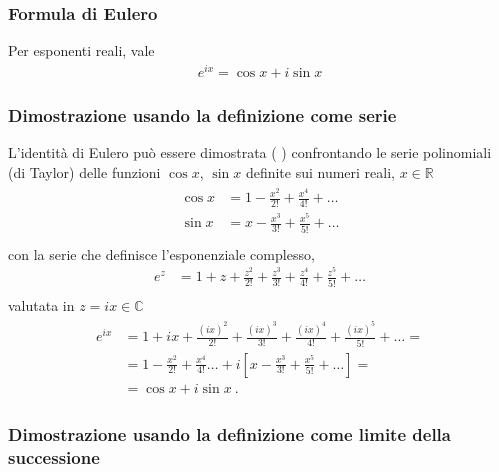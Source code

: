 \documentclass[letterpaper,10pt,italian]{jupyterBook}
\begin{document}
\subsubsection{Formula di Eulero}
\label{\detokenize{ch/algebra/complex-algebra:formula-di-eulero}}
\sphinxAtStartPar
Per esponenti reali, vale
\begin{equation*}
\begin{split}e^{i x} = \cos x + i \sin x\end{split}
\end{equation*}\subsubsection*{Dimostrazione usando la definizione come serie}

\sphinxAtStartPar
L’identità di Eulero può essere dimostrata ( ) confrontando le serie polinomiali (di Taylor) delle funzioni \(\cos x\), \(\sin x\) definite sui numeri reali, \(x \in \mathbb{R}\)
\begin{equation*}
\begin{split}\begin{aligned}
  \cos x & = 1 - \frac{x^2}{2!} + \frac{x^4}{4!} + \dots \\
  \sin x & = x - \frac{x^3}{3!} + \frac{x^5}{5!} + \dots \\
\end{aligned}\end{split}
\end{equation*}
\sphinxAtStartPar
con la serie che definisce l’esponenziale complesso,
\begin{equation*}
\begin{split}
  e^z & = 1 + z + \frac{z^2}{2!} + \frac{z^3}{3!} + \frac{z^4}{4!} + \frac{z^5}{5!} + \dots \\
\end{split}
\end{equation*}
\sphinxAtStartPar
valutata in \(z = i x \in \mathbb{C}\)
\begin{equation*}
\begin{split}\begin{aligned}
  e^{i x} 
      & = 1 + i x + \frac{(i x)^2}{2!} + \frac{(i x)^3}{3!} + \frac{(i x)^4}{4!} + \frac{(i x)^5}{5!} + \dots = \\
      & = 1 - \frac{x^2}{2!} + \frac{x^4}{4!} \dots + i \left[ x - \frac{x^3}{3!} + \frac{x^5}{5!}  + \dots \right] = \\
      & = \cos x + i \sin x \ .
\end{aligned}\end{split}
\end{equation*}\subsubsection*{Dimostrazione usando la definizione come limite della successione}
\end{document}
